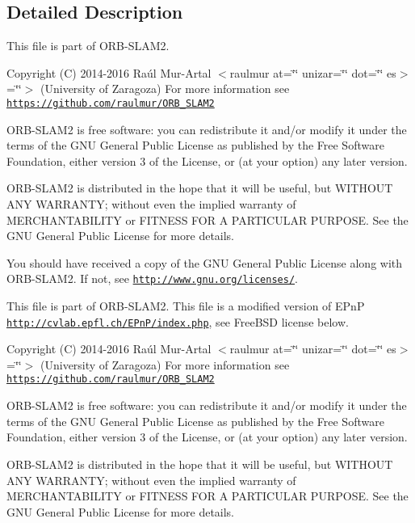\subsection{Detailed Description}
This file is part of O\+R\+B-\/\+S\+L\+A\+M2.

Copyright (C) 2014-\/2016 Raúl Mur-\/\+Artal $<$raulmur at=\char`\"{}\char`\"{} unizar=\char`\"{}\char`\"{} dot=\char`\"{}\char`\"{} es$>$=\char`\"{}\char`\"{}$>$ (University of Zaragoza) For more information see \href{https://github.com/raulmur/ORB_SLAM2}{\tt https\+://github.\+com/raulmur/\+O\+R\+B\+\_\+\+S\+L\+A\+M2}

O\+R\+B-\/\+S\+L\+A\+M2 is free software\+: you can redistribute it and/or modify it under the terms of the G\+NU General Public License as published by the Free Software Foundation, either version 3 of the License, or (at your option) any later version.

O\+R\+B-\/\+S\+L\+A\+M2 is distributed in the hope that it will be useful, but W\+I\+T\+H\+O\+UT A\+NY W\+A\+R\+R\+A\+N\+TY; without even the implied warranty of M\+E\+R\+C\+H\+A\+N\+T\+A\+B\+I\+L\+I\+TY or F\+I\+T\+N\+E\+SS F\+OR A P\+A\+R\+T\+I\+C\+U\+L\+AR P\+U\+R\+P\+O\+SE. See the G\+NU General Public License for more details.

You should have received a copy of the G\+NU General Public License along with O\+R\+B-\/\+S\+L\+A\+M2. If not, see \href{http://www.gnu.org/licenses/}{\tt http\+://www.\+gnu.\+org/licenses/}.

This file is part of O\+R\+B-\/\+S\+L\+A\+M2. This file is a modified version of E\+PnP \href{http://cvlab.epfl.ch/EPnP/index.php}{\tt http\+://cvlab.\+epfl.\+ch/\+E\+Pn\+P/index.\+php}, see Free\+B\+SD license below.

Copyright (C) 2014-\/2016 Raúl Mur-\/\+Artal $<$raulmur at=\char`\"{}\char`\"{} unizar=\char`\"{}\char`\"{} dot=\char`\"{}\char`\"{} es$>$=\char`\"{}\char`\"{}$>$ (University of Zaragoza) For more information see \href{https://github.com/raulmur/ORB_SLAM2}{\tt https\+://github.\+com/raulmur/\+O\+R\+B\+\_\+\+S\+L\+A\+M2}

O\+R\+B-\/\+S\+L\+A\+M2 is free software\+: you can redistribute it and/or modify it under the terms of the G\+NU General Public License as published by the Free Software Foundation, either version 3 of the License, or (at your option) any later version.

O\+R\+B-\/\+S\+L\+A\+M2 is distributed in the hope that it will be useful, but W\+I\+T\+H\+O\+UT A\+NY W\+A\+R\+R\+A\+N\+TY; without even the implied warranty of M\+E\+R\+C\+H\+A\+N\+T\+A\+B\+I\+L\+I\+TY or F\+I\+T\+N\+E\+SS F\+OR A P\+A\+R\+T\+I\+C\+U\+L\+AR P\+U\+R\+P\+O\+SE. See the G\+NU General Public License for more details.

